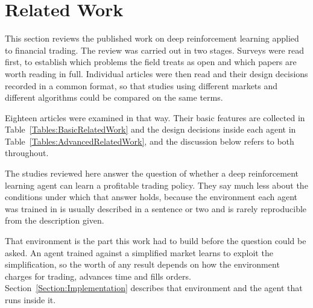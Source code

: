\section{Related Work}
\label{Section:RelatedWork}

This section reviews the published work on deep reinforcement learning applied to financial trading. The review was carried out in two stages. Surveys were read first, to establish which problems the field treats as open and which papers are worth reading in full. Individual articles were then read and their design decisions recorded in a common format, so that studies using different markets and different algorithms could be compared on the same terms.

Eighteen articles were examined in that way. Their basic features are collected in Table~\ref{Tables:BasicRelatedWork} and the design decisions inside each agent in Table~\ref{Tables:AdvancedRelatedWork}, and the discussion below refers to both throughout.







The studies reviewed here answer the question of whether a deep reinforcement learning agent can learn a profitable trading policy. They say much less about the conditions under which that answer holds, because the environment each agent was trained in is usually described in a sentence or two and is rarely reproducible from the description given.

That environment is the part this work had to build before the question could be asked. An agent trained against a simplified market learns to exploit the simplification, so the worth of any result depends on how the environment charges for trading, advances time and fills orders. Section~\ref{Section:Implementation} describes that environment and the agent that runs inside it.